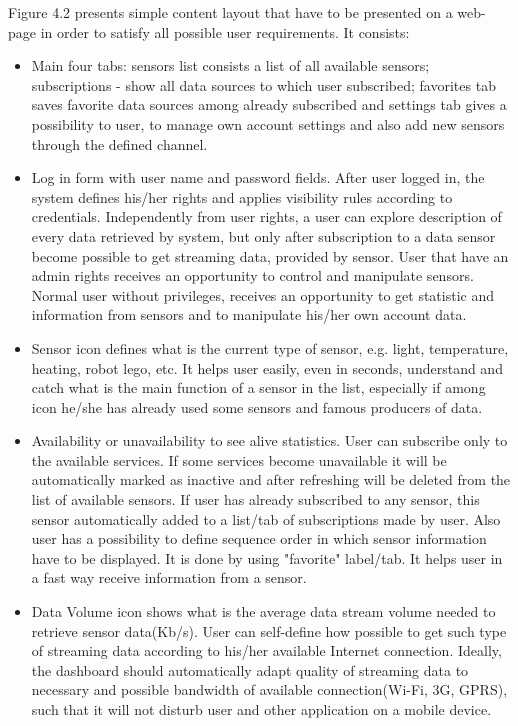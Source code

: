     Figure 4.2 presents simple content layout that have to be presented on a web-page in order to satisfy all possible user requirements. It consists:
      \begin{itemize}
      \item Main four tabs: sensors list consists a list of all available sensors; subscriptions - show all data sources to which user subscribed; favorites tab saves favorite data sources among already subscribed and settings tab gives a possibility to user, to manage own account settings and also add new sensors through the defined channel.
      \item Log in form with user name and password fields. After user logged in, the system defines his/her rights and applies visibility rules according to credentials. Independently from user rights, a user can explore description of every data retrieved by system, but only after subscription to a data sensor become possible to get streaming data, provided by sensor. User that have an admin rights receives an opportunity to control and manipulate sensors. Normal user without privileges, receives an opportunity to get statistic and information from sensors and to manipulate his/her own account data.
      \item Sensor icon defines what is the current type of sensor, e.g. light, temperature, heating, robot lego, etc. It helps user easily, even in seconds, understand and catch what is the main function of a sensor in the list, especially if among icon he/she has already used some sensors and famous producers of data.
      \item Availability or unavailability to see alive statistics. User can subscribe only to the available services. If some services become unavailable it will be automatically marked as inactive and after refreshing will be deleted from the list of available sensors. If user has already subscribed to any sensor, this sensor automatically added to a list/tab of subscriptions made by user. Also user has a possibility to define sequence order in which sensor information have to be displayed. It is done by using "favorite" label/tab. It helps user in a fast way receive information from a sensor.
      \item Data Volume icon shows what is the average data stream volume needed to retrieve sensor data(Kb/s). User can self-define how possible to get such type of streaming data according to his/her available Internet connection. Ideally, the dashboard should automatically adapt quality of streaming data to necessary and possible bandwidth of available connection(Wi-Fi, 3G, GPRS), such that it will not disturb user and other application on a mobile device.

\end{itemize}

